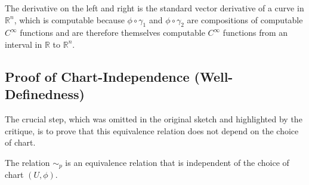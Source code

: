 \documentclass[12pt, a4paper]{article}
\begin{document}
The derivative on the left and right is the standard vector derivative of a curve in $\mathbb{R}^n$, which is computable because $\phi \circ \gamma_1$ and $\phi \circ \gamma_2$ are compositions of computable $C^\infty$ functions and are therefore themselves computable $C^\infty$ functions from an interval in $\mathbb{R}$ to $\mathbb{R}^n$.

\subsection*{Proof of Chart-Independence (Well-Definedness)}

The crucial step, which was omitted in the original sketch and highlighted by the critique, is to prove that this equivalence relation does not depend on the choice of chart.

\begin{claim}
The relation $\sim_p$ is an equivalence relation that is independent of the choice of chart $(U, \phi)$.
\end{claim}
\end{document}
